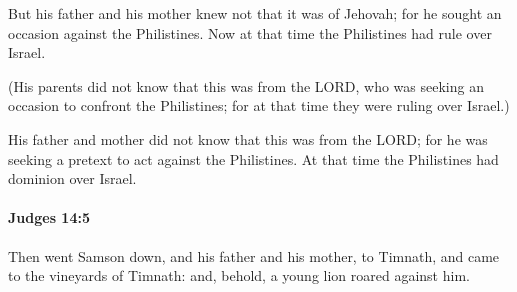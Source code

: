 			\begin{versebox}
					\item[BHS] 
					\item[ASV] But his father and his mother knew not that it was of Jehovah; for he sought an occasion against the Philistines. Now at that time the Philistines had rule over Israel.
					\item[NIV] (His parents did not know that this was from the LORD, who was seeking an occasion to confront the Philistines; for at that time they were ruling over Israel.)
					\item[NRSV] His father and mother did not know that this was from the LORD; for he was seeking a pretext to act against the Philistines. At that time the Philistines had dominion over Israel.
			\end{versebox}

		\paragraph{Judges 14:5} %
			\label{JUDGES-14-5}

			Then went Samson down, and his father and his mother, to Timnath, and came to the vineyards of Timnath: and, behold, a young lion roared against him.

